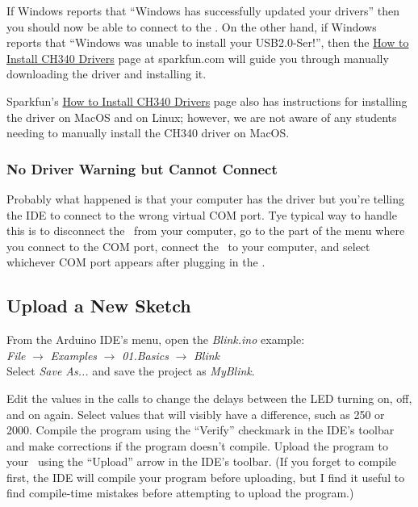 If Windows reports that ``Windows has successfully updated your drivers'' then
you should now be able to connect to the \nano. On the other hand, if Windows
reports that ``Windows was unable to install your USB2.0-Ser!'', then the
\href{https://learn.sparkfun.com/tutorials/how-to-install-ch340-drivers/}{How
to Install CH340 Drivers} page at sparkfun.com will guide you through manually
downloading the driver and installing it.

Sparkfun's \href{https://learn.sparkfun.com/tutorials/how-to-install-ch340-drivers/}
{How to Install CH340 Drivers} page also has instructions for installing the
driver on MacOS and on Linux; however, we are not aware of any students needing
to manually install the CH340 driver on MacOS.

\subsubsection{No Driver Warning but Cannot Connect}

Probably what happened is that your computer has the driver but you're telling
the IDE to connect to the wrong virtual COM port. Tye typical way to handle this
is to disconnect the \nano\ from your computer, go to the part of the menu where
you connect to the COM port, connect the \nano\ to your computer, and select
whichever COM port appears after plugging in the \nano.

\subsection{Upload a New Sketch}

From the Arduino IDE's menu, open the \textit{Blink.ino} example: \\
\textit{File} $\rightarrow$ \textit{Examples} $\rightarrow$ \textit{01.Basics} $\rightarrow$ \textit{Blink} \\
Select \textit{Save As...} and save the project as \textit{MyBlink}.

Edit the values in the  calls to change the delays between the
LED turning on, off, and on again. Select values that will visibly have a
difference, such as 250 or 2000. Compile the program using the ``Verify''
checkmark in the IDE's toolbar and make corrections if the program doesn't
compile. Upload the program to your \nano\ using the ``Upload'' arrow in the
IDE's toolbar. (If you forget to compile first, the IDE will compile your
program before uploading, but I find it useful to find compile-time mistakes
before attempting to upload the program.)


